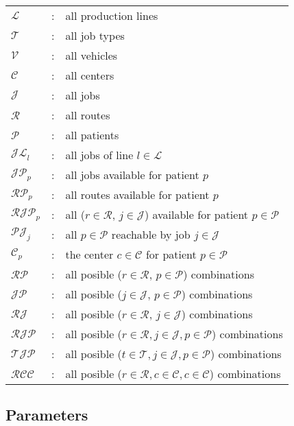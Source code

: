 \begin{tabular}{p{15mm}lp{105mm}}
    $\mathcal{L}$    & : & all production lines \\
    $\mathcal{T}$    & : & all job types \\                    
    $\mathcal{V}$    & : & all vehicles \\    
    $\mathcal{C}$    & : & all centers \\    
    $\mathcal{J}$    & : & all jobs \\    
    $\mathcal{R}$    & : & all routes \\    
    $\mathcal{P}$    & : & all patients \\
		$\mathcal{JL}_{l}$    & : & all jobs of line $l \in \mathcal{L}$ \\
		$\mathcal{JP}_{p}$    & : & all jobs available for patient $p$ \\
		$\mathcal{RP}_p$    & : & all routes available for patient $p$ \\
		$\mathcal{RJP}_p$    & : & all ($r \in \mathcal{R}$, $j \in \mathcal{J}$) available for patient $p \in \mathcal{P}$ \\
		$\mathcal{PJ}_j$    & : & all $p \in \mathcal{P}$ reachable by job $j \in \mathcal{J}$ \\
		$\mathcal{C}_p$    & : & the center $c \in \mathcal{C}$ for patient $p \in \mathcal{P}$ \\
		$\mathcal{RP}$    & : & all posible ($r \in \mathcal{R}$, $p \in \mathcal{P}$) combinations \\
		$\mathcal{JP}$    & : & all posible ($j \in \mathcal{J}$, $p \in \mathcal{P}$) combinations \\
		$\mathcal{RJ}$    & : & all posible ($r \in \mathcal{R}$, $j \in \mathcal{J}$) combinations \\
		$\mathcal{RJP}$    & : & all posible ($r \in \mathcal{R},j \in \mathcal{J},p \in \mathcal{P}$) combinations \\
		$\mathcal{TJP}$    & : & all posible ($t \in \mathcal{T},j \in \mathcal{J},p \in \mathcal{P}$) combinations \\
		$\mathcal{RCC}$    & : & all posible ($r \in \mathcal{R}, c \in \mathcal{C}, c \in \mathcal{C}$) combinations \\
\end{tabular}
\bigskip

\subsection{Parameters}


